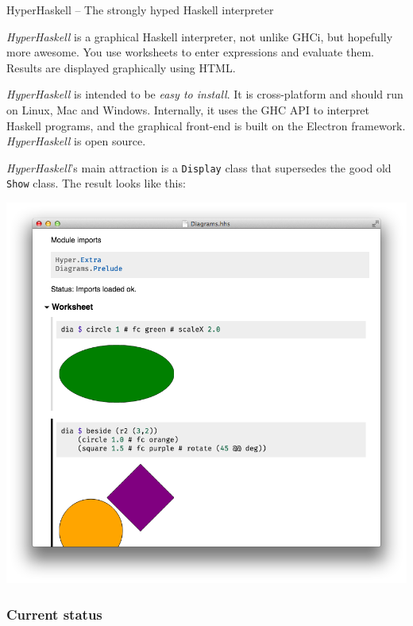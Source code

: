 \begin{hcarentry}[new]{HyperHaskell -- The strongly hyped Haskell interpreter}
\label{hyper-haskell}
\makeheader

\emph{HyperHaskell} is a graphical Haskell interpreter, not unlike GHCi, 
but hopefully more awesome. You use worksheets to enter expressions and 
evaluate them. Results are displayed graphically using HTML.

\emph{HyperHaskell} is intended to be \emph{easy to install}. It is cross-platform and should run on Linux, Mac and Windows. Internally, it uses the GHC API to interpret Haskell programs, and the graphical front-end is built on the Electron framework. \emph{HyperHaskell} is open source.

\emph{HyperHaskell}'s main attraction is a \verb`Display` class that supersedes the good old \verb`Show` class. The result looks like this:
\begin{center}
\includegraphics[width=\textwidth]{html/worksheet-diagrams.png}
\end{center}

\subsubsection*{Current status}


\end{hcarentry}

